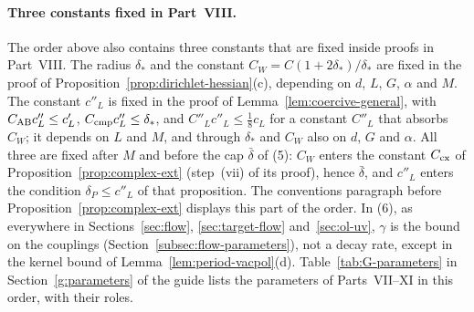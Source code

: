 \paragraph{Three constants fixed in Part~VIII.} The order above also contains three constants that are fixed inside proofs in Part~VIII. The radius $\delta_*$ and the constant $C_W=C(1+2\delta_*)/\delta_*$ are fixed in the proof of Proposition~\ref{prop:dirichlet-hessian}(c), depending on $d$, $L$, $G$, $\alpha$ and $M$. The constant $c''_L$ is fixed in the proof of Lemma~\ref{lem:coercive-general}, with $C_{\rm AB}c''_L\le c'_L$, $C_{\rm cmp}c''_L\le\delta_*$, and $C''_Lc''_L\le\frac18c_L$ for a constant $C''_L$ that absorbs $C_W$; it depends on $L$ and $M$, and through $\delta_*$ and $C_W$ also on $d$, $G$ and $\alpha$. All three are fixed after $M$ and before the cap $\bar\delta$ of (5): $C_W$ enters the constant $C_{\rm cx}$ of Proposition~\ref{prop:complex-ext} (step~(vii) of its proof), hence $\bar\delta$, and $c''_L$ enters the condition $\delta_P\le c''_L$ of that proposition. The conventions paragraph before Proposition~\ref{prop:complex-ext} displays this part of the order. In (6), as everywhere in Sections~\ref{sec:flow}, \ref{sec:target-flow} and~\ref{sec:ol-uv}, $\gamma$ is the bound on the couplings (Section~\ref{subsec:flow-parameters}), not a decay rate, except in the kernel bound of Lemma~\ref{lem:period-vacpol}(d). Table~\ref{tab:G-parameters} in Section~\ref{g:parameters} of the guide lists the parameters of Parts~VII--XI in this order, with their roles.
